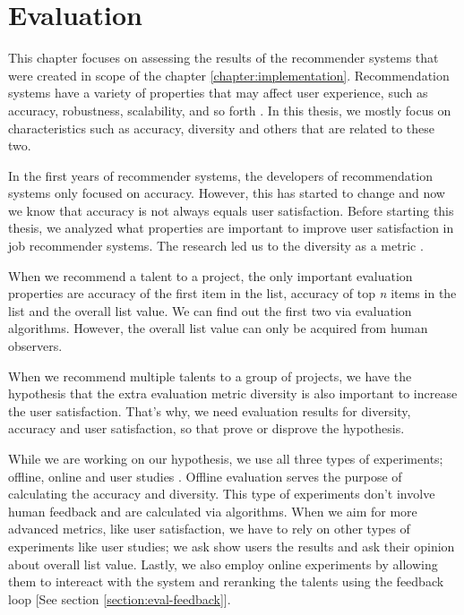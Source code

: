 
\chapter{Evaluation}\label{chapter:evaluation}

This chapter focuses on assessing the results of the recommender systems that were created in scope of the chapter \ref{chapter:implementation}. Recommendation systems have a variety of properties that may affect user experience, such as accuracy, robustness, scalability, and so forth \cite{shani2011evaluating}. In this thesis, we mostly focus on characteristics such as accuracy, diversity and others that are related to these two. 

In the first years of recommender systems, the developers of recommendation systems only focused on accuracy. However, this has started to change and now we know that accuracy is not always equals user satisfaction. Before starting this thesis, we analyzed what properties are important to improve user satisfaction in job recommender systems. The research led us to the diversity as a metric \cite{castells2015novelty}.

When we recommend a talent to a project, the only important evaluation properties are accuracy of the first item in the list, accuracy of top \textit{n} items in the list and the overall list value. We can find out the first two via evaluation algorithms. However, the overall list value can only be acquired from human observers. 

When we recommend multiple talents to a group of projects, we have the hypothesis that the extra evaluation metric diversity is also important to increase the user satisfaction. That's why, we need evaluation results for diversity, accuracy and user satisfaction, so that prove or disprove the hypothesis. 

While we are working on our hypothesis, we use all three types of experiments; offline, online and user studies \cite{shani2011evaluating}. Offline evaluation serves the purpose of calculating the accuracy and diversity. This type of experiments don't involve human feedback and are calculated via algorithms. When we aim for more advanced metrics, like user satisfaction, we have to rely on other types of experiments like user studies; we ask show users the results and ask their opinion about overall list value. Lastly, we also employ online experiments by allowing them to intereact with the system and reranking the talents using the feedback loop [See section \ref{section:eval-feedback}]. 

